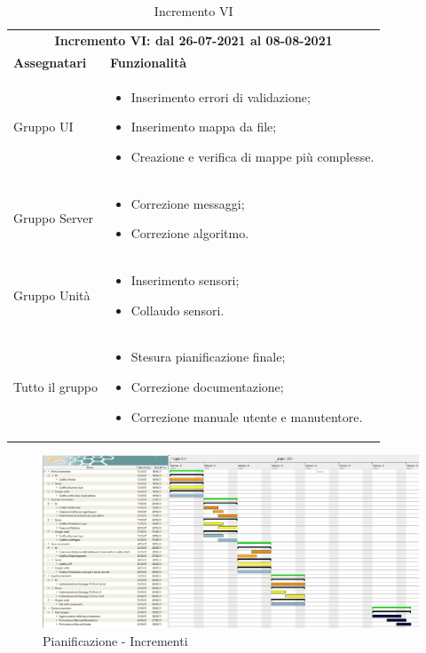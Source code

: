 \begin{table} [h!]
	\begin{center}
		\begin{tabular} { m{4cm}  m{11cm}  }	
			\multicolumn{2}{c}{	\textbf{Incremento VI: dal 26-07-2021 al 08-08-2021}} \\
			\rowcolor{lightgray}
			\textbf{Assegnatari} & \textbf{Funzionalità} \\
			Gruppo UI & \begin{itemize}
			\item Inserimento errori di validazione;
			\item Inserimento mappa da file;
			\item Creazione e verifica di mappe più complesse.
			\end{itemize}\\		
			Gruppo Server & \begin{itemize}
			\item Correzione messaggi;
			\item Correzione algoritmo.
		\end{itemize}\\		
		Gruppo Unità &  \begin{itemize}
			\item Inserimento sensori;
			\item Collaudo sensori.
		\end{itemize}\\	
		Tutto il gruppo &  \begin{itemize}
			\item Stesura pianificazione finale;
			\item Correzione documentazione;
			\item Correzione manuale utente e manutentore.
		\end{itemize}\\			
			
		\end{tabular}
		\caption{Incremento VI}
	\end{center}
\end{table}

\newpage
\begin{landscape}
	\begin{figure}[h!]
		\includegraphics[width=24cm]{images/6_incrementi}
		\caption{Pianificazione - Incrementi}
	\end{figure}
\end{landscape}

